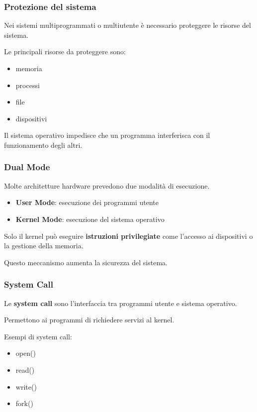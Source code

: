 \documentclass{beamer}
\begin{document}

\begin{frame}
	\frametitle{Protezione del sistema}
	
	Nei sistemi multiprogrammati o multiutente
	è necessario proteggere le risorse del sistema.
	
	Le principali risorse da proteggere sono:
	
	\begin{itemize}
		\item memoria
		\item processi
		\item file
		\item dispositivi
	\end{itemize}
	
	Il sistema operativo impedisce che un programma
	interferisca con il funzionamento degli altri.
	
\end{frame}


\begin{frame}
	\frametitle{Dual Mode}
	
	Molte architetture hardware prevedono due modalità
	di esecuzione.
	
	\begin{itemize}
		\item \textbf{User Mode}: esecuzione dei programmi utente
		\item \textbf{Kernel Mode}: esecuzione del sistema operativo
	\end{itemize}
	
	Solo il kernel può eseguire \textbf{istruzioni privilegiate}
	come l'accesso ai dispositivi o la gestione della memoria.
	
	Questo meccanismo aumenta la sicurezza del sistema.
	
\end{frame}


\begin{frame}
	\frametitle{System Call}
	
	Le \textbf{system call} sono l'interfaccia tra
	programmi utente e sistema operativo.
	
	Permettono ai programmi di richiedere servizi
	al kernel.
	
	Esempi di system call:
	
	\begin{itemize}
		\item open()
		\item read()
		\item write()
		\item fork()
	\end{itemize}
	
\end{frame}
\end{document}
